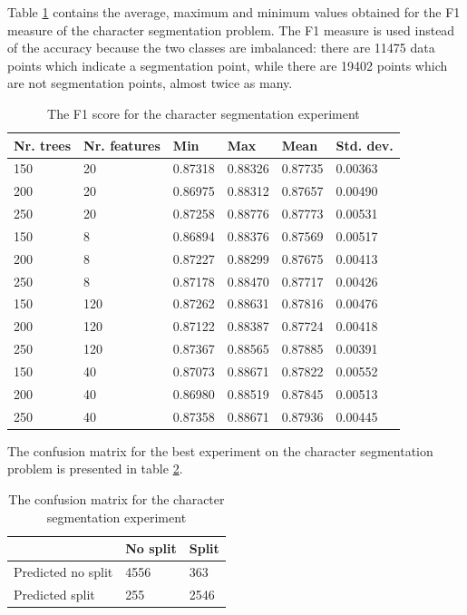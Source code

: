 Table \ref{table:seg_values} contains the average, maximum and minimum values obtained for the F1 measure\cite{fawcett2006introduction} of the character segmentation problem. The F1 measure is used instead of the accuracy because the two classes are imbalanced: there are 11475 data points which indicate a segmentation point, while there are 19402 points which are not segmentation points, almost twice as many. 

\begin{table}[h]
\caption{The F1 score for the character segmentation experiment}
\label{table:seg_values}
\begin{tabular}{llllll}
\toprule
Nr. trees & Nr. features & Min     & Max     & Mean    & Std. dev. \\ 
\midrule
150 & 20 & 0.87318 & 0.88326 & 0.87735 & 0.00363 \\ 
200 & 20 & 0.86975 & 0.88312 & 0.87657 & 0.00490 \\ 
250 & 20 & 0.87258 & 0.88776 & 0.87773 & 0.00531 \\ 
150 & 8 & 0.86894 & 0.88376 & 0.87569 & 0.00517 \\ 
200 & 8 & 0.87227 & 0.88299 & 0.87675 & 0.00413 \\ 
250 & 8 & 0.87178 & 0.88470 & 0.87717 & 0.00426 \\ 
150 & 120 & 0.87262 & 0.88631 & 0.87816 & 0.00476 \\ 
200 & 120 & 0.87122 & 0.88387 & 0.87724 & 0.00418 \\ 
250 & 120 & 0.87367 & 0.88565 & 0.87885 & 0.00391 \\ 
150 & 40 & 0.87073 & 0.88671 & 0.87822 & 0.00552 \\ 
200 & 40 & 0.86980 & 0.88519 & 0.87845 & 0.00513 \\ 
250 & 40 & 0.87358 & 0.88671 & 0.87936 & 0.00445 \\ 
\bottomrule
\end{tabular}
\end{table}

The confusion matrix for the best experiment on the character segmentation problem is presented in table \ref{table:seg_conf}.

\begin{table}[h]
\caption{The confusion matrix for the character segmentation experiment}
\label{table:seg_conf}
\begin{tabular}{lll}
\hline
 & No split & Split \\ \hline
Predicted no split & 4556 & 363 \\ 
Predicted split & 255 & 2546 \\  \hline
\end{tabular}
\end{table}

